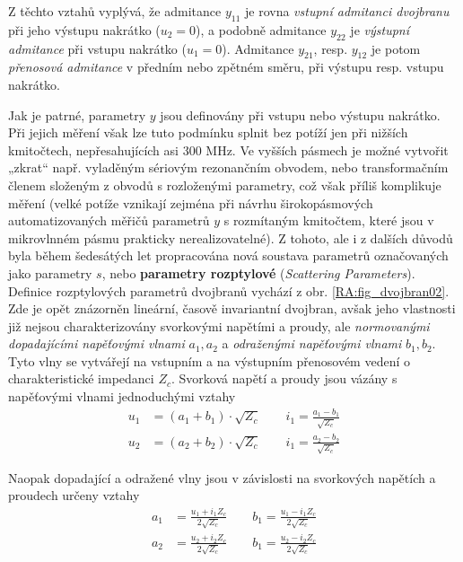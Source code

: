       Z těchto vztahů vyplývá, že admitance \(y_{11}\) je rovna \emph{vstupní admitanci dvojbranu} 
      při jeho výstupu nakrátko (\(u_2=0\)), a podobně admitance \(y_{22}\) je \emph{výstupní 
      admitance} při vstupu nakrátko (\(u_1=0\)). Admitance \(y_{21}\), resp. \(y_{12}\) je potom 
      \emph{přenosová admitance} v předním nebo zpětném směru, při výstupu resp. vstupu nakrátko.
      
      Jak je patrné, parametry \(y\) jsou definovány při vstupu nebo výstupu nakrátko. Při jejich 
      měření však lze tuto podmínku splnit bez potíží jen při nižších kmitočtech, nepřesahujících 
      asi 300 MHz. Ve vyšších pásmech je možné vytvořit „zkrat“ např. vyladěným sériovým 
      rezonančním obvodem, nebo transformačním členem složeným z obvodů s rozloženými parametry, 
      což však příliš komplikuje měření (velké potíže vznikají zejména při návrhu širokopásmových 
      automatizovaných měřičů parametrů \(y\) s rozmítaným kmitočtem, které jsou v mikrovlnném 
      pásmu prakticky nerealizovatelné). Z tohoto, ale i z dalších důvodů byla během šedesátých let 
      propracována nová soustava parametrů označovaných jako parametry \(s\), nebo 
      \textbf{parametry rozptylové} (\emph{Scattering Parameters}). Definice rozptylových parametrů 
      dvojbranů vychází z obr. \ref{RA:fig_dvojbran02}. Zde je opět znázorněn lineární, časově 
      invariantní dvojbran, avšak jeho vlastnosti již nejsou charakterizovány svorkovými napětími a 
      proudy, ale \emph{normovanými dopadajícími napěťovými vlnami} \(a_1, a_2\) a \emph{odraženými 
      napěťovými vlnami} \(b_1, b_2\). Tyto vlny se vytvářejí na vstupním a na výstupním přenosovém 
      vedení o charakteristické impedanci \(Z_c\). Svorková napětí a proudy jsou vázány s 
      napěťovými vlnami jednoduchými vztahy
      \begin{align}\label{RA:eq_01}
      u_1 &= (a_1 + b_1)\cdot\sqrt{Z_c} \qquad i_1 = \frac{a_1-b_1}{\sqrt{Z_c}}   \\ 
      u_2 &= (a_2 + b_2)\cdot\sqrt{Z_c} \qquad i_1 = \frac{a_2-b_2}{\sqrt{Z_c}}
      \end{align}
      
      Naopak dopadající a odražené vlny jsou v závislosti na svorkových napětích a proudech určeny 
      vztahy
      \begin{align}\label{RA:eq_02}
      a_1 &= \frac{u_1 + i_1Z_c}{2\sqrt{Z_c}} \qquad b_1 = \frac{u_1 - i_1Z_c}{2\sqrt{Z_c}}   \\ 
      a_2 &= \frac{u_2 + i_2Z_c}{2\sqrt{Z_c}} \qquad b_1 = \frac{u_2 - i_2Z_c}{2\sqrt{Z_c}}
      \end{align}
      
